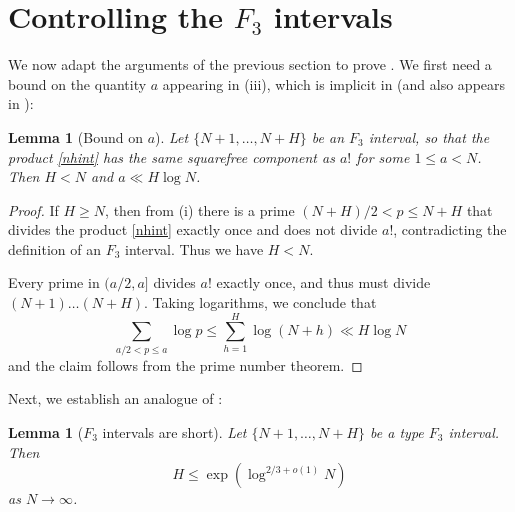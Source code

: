 \documentclass[12pt]{amsart}
\newtheorem{lemma}[theorem]{Lemma}
\begin{document}
\section{Controlling the \texorpdfstring{$F_3$}{F3} intervals}\label{f3-sec}

We now adapt the arguments of the previous section to prove .  We first need a bound on the quantity $a$ appearing in (iii), which is implicit in \cite[p. 343]{erdos-graham} (and also appears in \cite[(10)]{luca}):

\begin{lemma}[Bound on $a$]\label{abound}  Let $\{N+1,\dots,N+H\}$ be an $F_3$ interval, so that the product \eqref{nhint} has the same squarefree component as $a!$ for some $1 \leq a < N$.  Then $H < N$ and $a \ll H \log N$.
\end{lemma}

\begin{proof} If $H \geq N$, then from (i) there is a prime $(N+H)/2 < p \leq N+H$ that divides the product \eqref{nhint} exactly once and does not divide $a!$, contradicting the definition of an $F_3$ interval.  Thus we have $H < N$.

Every prime in $(a/2,a]$ divides $a!$ exactly once, and thus must divide $(N+1) \dots (N+H)$.  Taking logarithms, we conclude that
$$ \sum_{a/2 < p \leq a} \log p \leq \sum_{h=1}^H \log (N+h) \ll H \log N$$
and the claim follows from the prime number theorem.
\end{proof}

Next, we establish an analogue of :

\begin{lemma}[$F_3$ intervals are short]\label{hf3}  Let $\{N+1,\dots,N+H\}$ be a type $F_3$ interval.  Then
\begin{equation}\label{HBound}
 H \leq \exp(\log^{2/3+o(1)} N)
\end{equation}
as $N \to \infty$.
\end{lemma}
\end{document}

